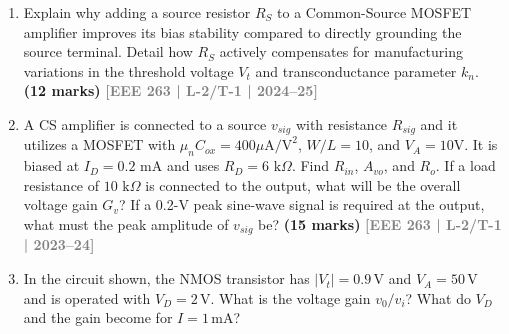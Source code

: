 \documentclass[12pt]{article}
\newcommand{\yr}[1]{\hfill\textcolor{gray}{\small\textbf{[#1]}}}
\newcommand{\mk}[1]{\textcolor{orange!70!black}{\small\textbf{(#1 marks)}}}
\begin{document}
\begin{enumerate}
(i) Find the DC bias voltage $V_D$ and drain current $I_D$ (ignore Early effect for bias). \\
(ii) Find $g_m$, $r_o$ and draw the small-signal equivalent circuit. \\
(iii) Determine $R_{in}$, $R_o$, and the overall voltage gain $v_o/v_{sig}$. \\
(iv) Calculate the maximum peak value of $v_{sig}$ such that $v_{gs} \le 0.1\,V_{OV}$ (small-signal approximation valid). \\
(v) Suggest a circuit modification that will double the maximum $v_{sig}$ found in (iv) without changing the DC bias point.\\
\begin{center}
\end{center}
\mk{35} \yr{EEE 263 | L-2/T-1 | 2024--25}


\item Explain why adding a source resistor $R_S$ to a Common-Source MOSFET amplifier improves its bias stability compared to directly grounding the source terminal. Detail how $R_S$ actively compensates for manufacturing variations in the threshold voltage $V_t$ and transconductance parameter $k_n$.
\mk{12} \yr{EEE 263 | L-2/T-1 | 2024--25}



\item A CS amplifier is connected to a source $v_{sig}$ with resistance $R_{sig}$ and it utilizes a MOSFET with $\mu_n C_{ox} = 400 \mu\text{A/V}^2$, $W/L = 10$, and $V_A = 10\text{V}$. It is biased at $I_D = 0.2\text{ mA}$ and uses $R_D = 6\text{ k}\Omega$. Find $R_{in}$, $A_{vo}$, and $R_o$. If a load resistance of $10\text{ k}\Omega$ is connected to the output, what will be the overall voltage gain $G_v$? If a 0.2-V peak sine-wave signal is required at the output, what must the peak amplitude of $v_{sig}$ be?
\mk{15} \yr{EEE 263 | L-2/T-1 | 2023--24}


\item In the circuit shown, the NMOS transistor has $|V_t|=0.9\,\text{V}$ and $V_A=50\,\text{V}$ and is operated with $V_D=2\,\text{V}$. What is the voltage gain $v_0/v_i$? What do $V_D$ and the gain become for $I=1\,\text{mA}$?

\begin{center}
\begin{circuitikz}[american, line width=0.9pt, font=\small, line cap=round]


\end{circuitikz}
\end{center}
\end{enumerate}
\end{document}
